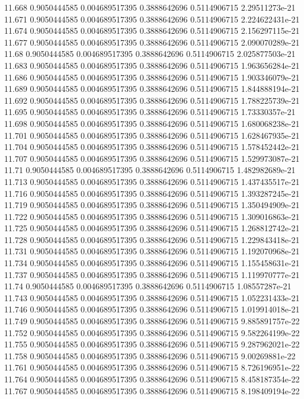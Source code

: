 {11.668 0.9050444585 0.004689517395 0.3888642696 0.5114906715 2.29511273e-21
11.671 0.9050444585 0.004689517395 0.3888642696 0.5114906715 2.224622431e-21
11.674 0.9050444585 0.004689517395 0.3888642696 0.5114906715 2.156297115e-21
11.677 0.9050444585 0.004689517395 0.3888642696 0.5114906715 2.090070289e-21
11.68 0.9050444585 0.004689517395 0.3888642696 0.5114906715 2.025877503e-21
11.683 0.9050444585 0.004689517395 0.3888642696 0.5114906715 1.963656284e-21
11.686 0.9050444585 0.004689517395 0.3888642696 0.5114906715 1.903346079e-21
11.689 0.9050444585 0.004689517395 0.3888642696 0.5114906715 1.844888194e-21
11.692 0.9050444585 0.004689517395 0.3888642696 0.5114906715 1.788225739e-21
11.695 0.9050444585 0.004689517395 0.3888642696 0.5114906715 1.73330357e-21
11.698 0.9050444585 0.004689517395 0.3888642696 0.5114906715 1.680068238e-21
11.701 0.9050444585 0.004689517395 0.3888642696 0.5114906715 1.628467935e-21
11.704 0.9050444585 0.004689517395 0.3888642696 0.5114906715 1.578452442e-21
11.707 0.9050444585 0.004689517395 0.3888642696 0.5114906715 1.529973087e-21
11.71 0.9050444585 0.004689517395 0.3888642696 0.5114906715 1.482982689e-21
11.713 0.9050444585 0.004689517395 0.3888642696 0.5114906715 1.437435517e-21
11.716 0.9050444585 0.004689517395 0.3888642696 0.5114906715 1.393287245e-21
11.719 0.9050444585 0.004689517395 0.3888642696 0.5114906715 1.350494909e-21
11.722 0.9050444585 0.004689517395 0.3888642696 0.5114906715 1.309016863e-21
11.725 0.9050444585 0.004689517395 0.3888642696 0.5114906715 1.268812742e-21
11.728 0.9050444585 0.004689517395 0.3888642696 0.5114906715 1.229843418e-21
11.731 0.9050444585 0.004689517395 0.3888642696 0.5114906715 1.192070968e-21
11.734 0.9050444585 0.004689517395 0.3888642696 0.5114906715 1.155458631e-21
11.737 0.9050444585 0.004689517395 0.3888642696 0.5114906715 1.119970777e-21
11.74 0.9050444585 0.004689517395 0.3888642696 0.5114906715 1.08557287e-21
11.743 0.9050444585 0.004689517395 0.3888642696 0.5114906715 1.052231433e-21
11.746 0.9050444585 0.004689517395 0.3888642696 0.5114906715 1.019914018e-21
11.749 0.9050444585 0.004689517395 0.3888642696 0.5114906715 9.885891757e-22
11.752 0.9050444585 0.004689517395 0.3888642696 0.5114906715 9.582264199e-22
11.755 0.9050444585 0.004689517395 0.3888642696 0.5114906715 9.287962021e-22
11.758 0.9050444585 0.004689517395 0.3888642696 0.5114906715 9.00269881e-22
11.761 0.9050444585 0.004689517395 0.3888642696 0.5114906715 8.726196951e-22
11.764 0.9050444585 0.004689517395 0.3888642696 0.5114906715 8.458187354e-22
11.767 0.9050444585 0.004689517395 0.3888642696 0.5114906715 8.198409194e-22
}
